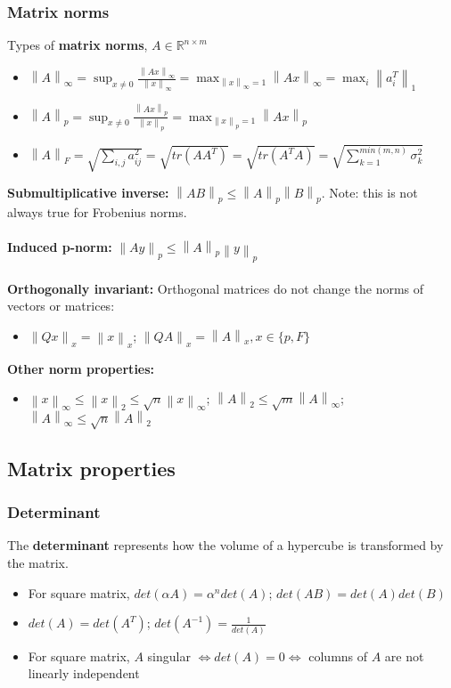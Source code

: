 \documentclass{article}
\newcommand{\norm}[2]{\left\lVert#1\right\rVert_#2}
\begin{document}
\subsubsection{Matrix norms}
\noindent Types of \textbf{matrix norms}, $A \in \mathbb{R}^{n \times m}$
\begin{itemize}
    \item $\norm{A}{\infty} = \sup_{x\neq 0}\frac{\norm{Ax}{\infty}}{\norm{x}{\infty}} = \max_{\norm{x}{\infty}=1}\norm{Ax}{\infty} = \max_i\norm{a_i^T}{1}$
    \item $\norm{A}{p} = \sup_{x\neq 0}\frac{\norm{Ax}{p}}{\norm{x}{p}} = \max_{\norm{x}{p}=1}\norm{Ax}{p}$
    \item $\norm{A}{F} = \sqrt{\sum_{i,j} a_{ij}^2} = \sqrt{tr(AA^T)} = \sqrt{tr(A^TA)} = \sqrt{\sum_{k=1}^{min(m,n)}\sigma_k^2} $
\end{itemize}
\textbf{Submultiplicative inverse:} $\norm{AB}{p} \leq \norm{A}{p}\norm{B}{p}$. Note: this is not always true for Frobenius norms.\\ \\
\textbf{Induced p-norm: } $\norm{Ay}{p} \leq \norm{A}{p}\norm{y}{p}$\\ \\
\textbf{Orthogonally invariant:} Orthogonal matrices do not change the norms of vectors or matrices:
\begin{itemize}
    \item $\norm{Qx}{x} = \norm{x}{x}$; $\norm{QA}{x} = \norm{A}{x}, x \in \{p, F\}$
\end{itemize}
\textbf{Other norm properties:}
\begin{itemize}
    \item $\norm{x}{\infty} \leq \norm{x}{2} \leq \sqrt{n}\norm{x}{\infty}$; $\norm{A}{2} \leq \sqrt{m}\norm{A}{\infty}$; $\norm{A}{\infty} \leq \sqrt{n}\norm{A}{2}$
\end{itemize}

\subsection{Matrix properties}
\subsubsection{Determinant}
The \textbf{determinant} represents how the volume of a hypercube is transformed by the matrix.
\begin{itemize}
    \item For square matrix, $det(\alpha A) = \alpha^ndet(A)$; $det(AB) = det(A)det(B)$
    \item $det(A) = det(A^T)$; $det(A^{-1}) = \frac{1}{det(A)}$
    \item For square matrix, $A$ singular $\Leftrightarrow det(A) = 0 \Leftrightarrow$ columns of $A$ are not linearly independent
\end{itemize}
\end{document}
